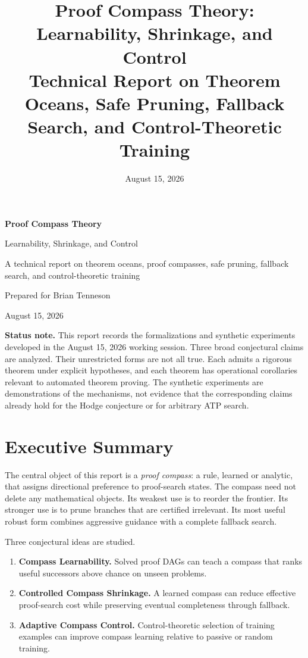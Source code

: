 \documentclass[11pt]{article}
\title{\textbf{Proof Compass Theory: Learnability, Shrinkage, and Control}\\
\large Technical Report on Theorem Oceans, Safe Pruning, Fallback Search, and Control-Theoretic Training}
\date{August 15, 2026}
\begin{document}
\begin{titlepage}
\centering
\vspace*{1.0in}
{\Huge\bfseries Proof Compass Theory\par}
\vspace{0.25in}
{\LARGE Learnability, Shrinkage, and Control\par}
\vspace{0.45in}
{\large A technical report on theorem oceans, proof compasses, safe pruning, fallback search, and control-theoretic training\par}
\vfill
{\large Prepared for Brian Tenneson\par}
\vspace{0.12in}
{\large August 15, 2026\par}
\vspace{0.4in}
\begin{minipage}{0.84\textwidth}
\small
\textbf{Status note.}
This report records the formalizations and synthetic experiments developed in the August 15, 2026 working session. Three broad conjectural claims are analyzed. Their unrestricted forms are not all true. Each admits a rigorous theorem under explicit hypotheses, and each theorem has operational corollaries relevant to automated theorem proving. The synthetic experiments are demonstrations of the mechanisms, not evidence that the corresponding claims already hold for the Hodge conjecture or for arbitrary ATP search.
\end{minipage}
\vfill
\end{titlepage}

\tableofcontents
\newpage

\section{Executive Summary}

The central object of this report is a \emph{proof compass}: a rule, learned or analytic, that assigns directional preference to proof-search states. The compass need not delete any mathematical objects. Its weakest use is to reorder the frontier. Its stronger use is to prune branches that are certified irrelevant. Its most useful robust form combines aggressive guidance with a complete fallback search.

Three conjectural ideas are studied.

\begin{enumerate}[label=\textbf{C\arabic*.},leftmargin=2.6em]
\item \textbf{Compass Learnability.} Solved proof DAGs can teach a compass that ranks useful successors above chance on unseen problems.
\item \textbf{Controlled Compass Shrinkage.} A learned compass can reduce effective proof-search cost while preserving eventual completeness through fallback.
\item \textbf{Adaptive Compass Control.} Control-theoretic selection of training examples can improve compass learning relative to passive or random training.
\end{enumerate}
\end{document}
